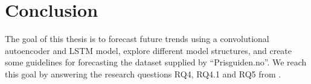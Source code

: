 \section{Conclusion}
\label{section:Discussion:Conclusion}



The goal of this thesis is to forecast future trends using a convolutional autoencoder and LSTM model, explore different model structures,
and create some guidelines for forecasting the dataset supplied by ``Prisguiden.no''.
We reach this goal by answering the research questions RQ4, RQ4.1 and RQ5 from .

